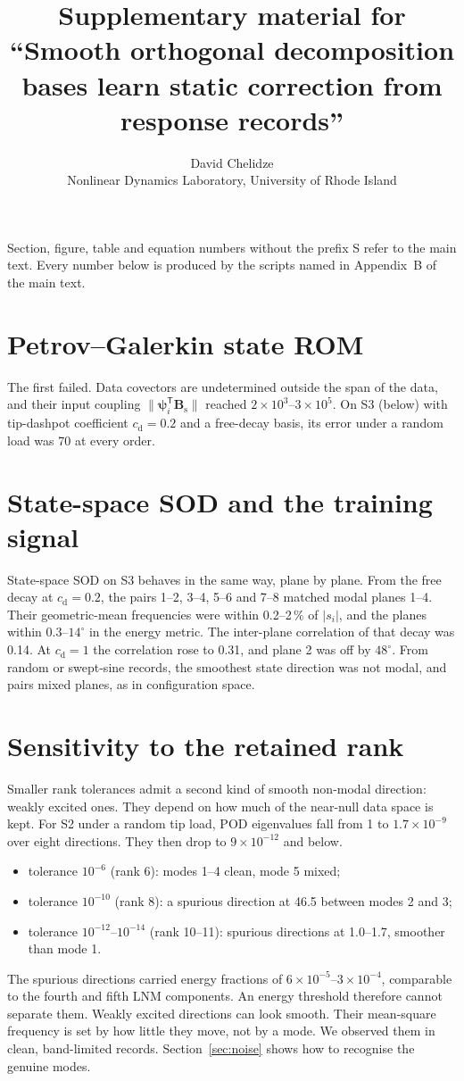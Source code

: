 \documentclass[11pt]{article}
\title{Supplementary material for\\ ``Smooth orthogonal decomposition bases learn static correction from response records''}
\author{David Chelidze\\ Nonlinear Dynamics Laboratory, University of Rhode Island}
\date{}
\begin{document}
\maketitle
\noindent Section, figure, table and equation numbers without the prefix S refer to the main text. Every number below is produced by the scripts named in Appendix~B of the main text.

\section{Petrov--Galerkin state ROM}\label{sec:s-pg}
The first failed. Data covectors are undetermined outside the span of the data, and their input coupling $\|\bm{\psi}_i^{\mathsf T}\bm{B}_{\mathrm s}\|$ reached $2\times10^3$--$3\times10^5$. On S3 (below) with tip-dashpot coefficient $c_{\mathrm d}=0.2$ and a free-decay basis, its error under a random load was 70 at every order.
\section{State-space SOD and the training signal}\label{sec:s-smix}
State-space SOD on S3 behaves in the same way, plane by plane. From the free decay at $c_{\mathrm d}=0.2$, the pairs 1--2, 3--4, 5--6 and 7--8 matched modal planes 1--4. Their geometric-mean frequencies were within 0.2--2\,\% of $|s_i|$, and the planes within $0.3$--$14^\circ$ in the energy metric. The inter-plane correlation of that decay was 0.14.
At $c_{\mathrm d}=1$ the correlation rose to 0.31, and plane 2 was off by $48^\circ$.
From random or swept-sine records, the smoothest state direction was not modal, and pairs mixed planes, as in configuration space.
\section{Sensitivity to the retained rank}\label{sec:rank}
Smaller rank tolerances admit a second kind of smooth non-modal direction: weakly excited ones. They depend on how much of the near-null data space is kept.
For S2 under a random tip load, POD eigenvalues fall from 1 to $1.7\times10^{-9}$ over eight directions. They then drop to $9\times10^{-12}$ and below.
\begin{itemize}
\item tolerance $10^{-6}$ (rank 6): modes 1--4 clean, mode 5 mixed;
\item tolerance $10^{-10}$ (rank 8): a spurious direction at 46.5 between modes 2 and 3;
\item tolerance $10^{-12}$--$10^{-14}$ (rank 10--11): spurious directions at 1.0--1.7, smoother than mode 1.
\end{itemize}
The spurious directions carried energy fractions of $6\times10^{-5}$--$3\times10^{-4}$, comparable to the fourth and fifth LNM components. An energy threshold therefore cannot separate them.
Weakly excited directions can look smooth. Their mean-square frequency is set by how little they move, not by a mode.
We observed them in clean, band-limited records. Section~\ref{sec:noise} shows how to recognise the genuine modes.
\end{document}
